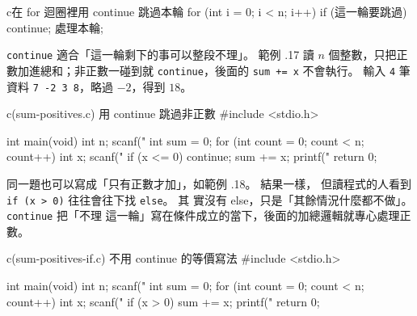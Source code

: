

\begin{code}{c}{在 for 迴圈裡用 continue 跳過本輪}
for (int i = 0; i < n; i++) {
    if (這一輪要跳過) {
        continue;
    }
    處理本輪;
}
\end{code}


\texttt{continue} 適合「這一輪剩下的事可以整段不理」。 範例
\thechapter.17 讀 $n$ 個整數，只把正數加進總和；非正數一碰到就
\texttt{continue}，後面的 \texttt{sum += x} 不會執行。 輸入
\texttt{4} 筆資料 \texttt{7 -2 3 8}，略過 $-2$，得到 $18$。

\begin{example}{c}{(sum-positives.c) 用 continue 跳過非正數}
#include <stdio.h>

int main(void) {
    int n;
    scanf("%
    int sum = 0;
    for (int count = 0; count < n; count++) {
        int x;
        scanf("%
        if (x <= 0) {
            continue;
        }
        sum += x;
    }
    printf("%
    return 0;
}
\end{example}


同一題也可以寫成「只有正數才加」，如範例 \thechapter.18。 結果一樣，
但讀程式的人看到 \texttt{if (x > 0)} 往往會往下找 \texttt{else}。 其
實沒有 else，只是「其餘情況什麼都不做」。 \texttt{continue} 把「不理
這一輪」寫在條件成立的當下，後面的加總邏輯就專心處理正數。

\begin{example}{c}{(sum-positives-if.c) 不用 continue 的等價寫法}
#include <stdio.h>

int main(void) {
    int n;
    scanf("%
    int sum = 0;
    for (int count = 0; count < n; count++) {
        int x;
        scanf("%
        if (x > 0) {
            sum += x;
        }
    }
    printf("%
    return 0;
}
\end{example}


